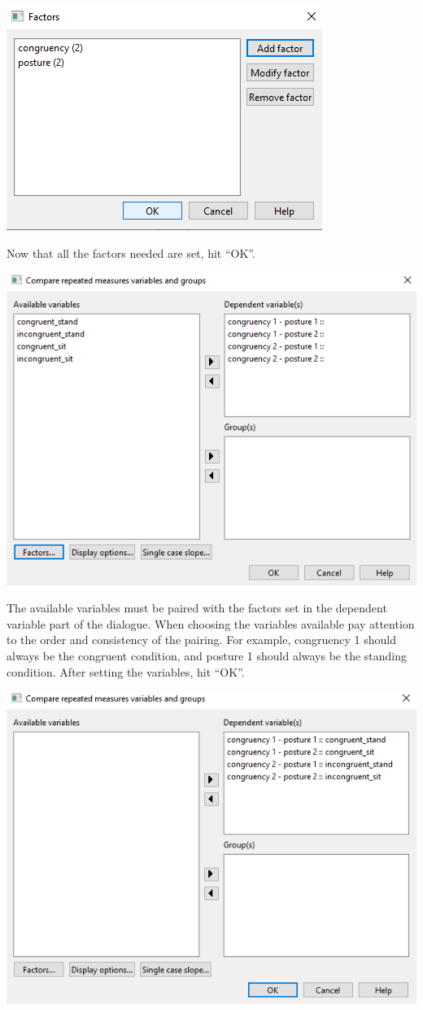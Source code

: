 \documentclass[
]{book}
\begin{document}
\includegraphics{img/ch10/10.5CRMV_2factors_set.png}

Now that all the factors needed are set, hit ``OK''.

\includegraphics{img/ch10/10.5CRMV_dependents_set.png}

The available variables must be paired with the factors set in the dependent variable part of the dialogue. When choosing the variables available pay attention to the order and consistency of the pairing. For example, congruency 1 should always be the congruent condition, and posture 1 should always be the standing condition. After setting the variables, hit ``OK''.

\includegraphics{img/ch10/10.5CRMV_dependents_paired.png}
\end{document}
